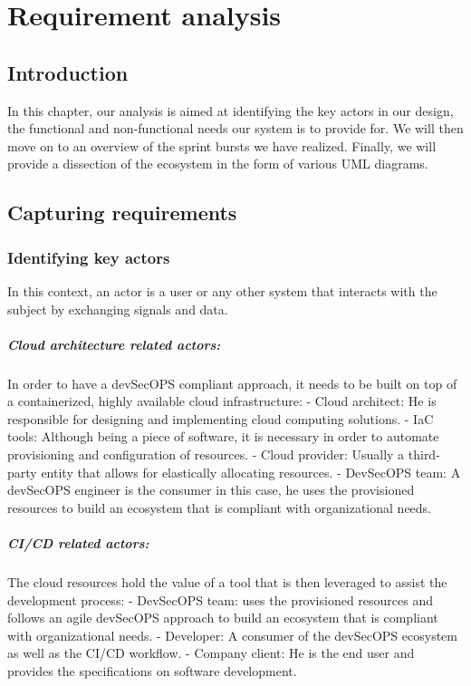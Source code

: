 \graphicspath{{./assets/}}
\setcounter{mtc}{2}
\chapter{Requirement analysis  }
\minitoc
\newpage
\section*{Introduction}
In this chapter, our analysis is aimed at identifying the key actors in our design, the functional and non-functional needs our system is to provide for. We will then move on to an overview of the sprint bursts we have realized. Finally, we will provide a dissection of the ecosystem in the form of various UML diagrams.
\section{Capturing requirements}
\subsection{Identifying key actors}
In this context, an actor is a user or any other system that interacts with the subject by exchanging signals and data.
\paragraph{Cloud architecture related actors:}
In order to have a devSecOPS compliant approach, it needs to be built on top of a containerized, highly available cloud infrastructure:
\newline
-	Cloud architect: He is responsible for designing and implementing cloud computing solutions.
\newline
-	IaC tools: Although being a piece of software, it is necessary in order to automate provisioning and configuration of resources.
\newline
-	Cloud provider: Usually a third-party entity that allows for elastically allocating resources.
\newline
-	DevSecOPS team: A devSecOPS engineer is the consumer in this case, he uses the provisioned resources to build an ecosystem that is compliant with organizational needs.
\paragraph{CI/CD related actors:}
The cloud resources hold the value of a tool that is then leveraged to assist the development process:
\newline
-	DevSecOPS team: uses the provisioned resources and follows an agile devSecOPS approach to build an ecosystem that is compliant with organizational needs.
\newline
-	Developer: A consumer of the devSecOPS ecosystem as well as the CI/CD workflow.
\newline
-	Company client: He is the end user and provides the specifications on software development.

